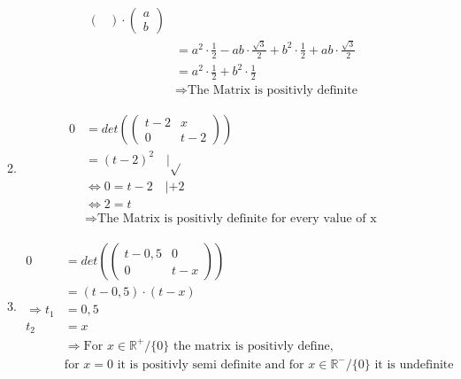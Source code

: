 \documentclass[]{book}
\theoremstyle{definition}
\newcommand{\bb}[1]{\mathbb{#1}}
\newcommand{\R}{\bb{R}}
\begin{document}
\begin{enumerate}
\begin{enumerate}
\begin{align*}
\begin{pmatrix}
                \end{pmatrix}
                \cdot
                \begin{pmatrix}
                    a \\
                    b
                \end{pmatrix}\\
                & = 
                a^2 \cdot \frac{1}{2} -ab \cdot \frac{\sqrt{3}}{2} + 
                b^2 \cdot \frac{1}{2} + ab \cdot \frac{\sqrt{3}}{2} \\
                & = 
                a^2 \cdot \frac{1}{2} + 
                b^2 \cdot \frac{1}{2} \\
                & \Rightarrow \text{The Matrix is positivly definite}
            \end{align*}
        \item \begin{align*}
            0 & = det (
                \begin{pmatrix}
                    t - 2 & x \\
                    0 & t - 2
                \end{pmatrix}
            ) \\
            & = (t - 2)^2 \quad | \sqrt{}\\
            & \Leftrightarrow 0 = t - 2 \quad | + 2 \\
            & \Leftrightarrow 2 = t \\
            & \Rightarrow \text{The Matrix is positivly definite for every value of x}
        \end{align*}
        \item \begin{align*}
            0 & = det (
                \begin{pmatrix}
                    t - 0,5 & 0 \\
                    0 & t - x
                \end{pmatrix}
            ) \\
            & = (t - 0,5) \cdot (t - x) \\
            \Rightarrow t_1 & = 0,5 \\
            t_2 & = x \\
            & \Rightarrow \text{For } x \in \R^+/\{0\} \text{ the matrix is positivly define,}\\ &\text{for } x = {0} \text{ it is positivly semi definite and for } x \in \R^-/\{0\} \text{ it is undefinite}
         \end{align*}

\end{enumerate}
\end{enumerate}
\end{document}
